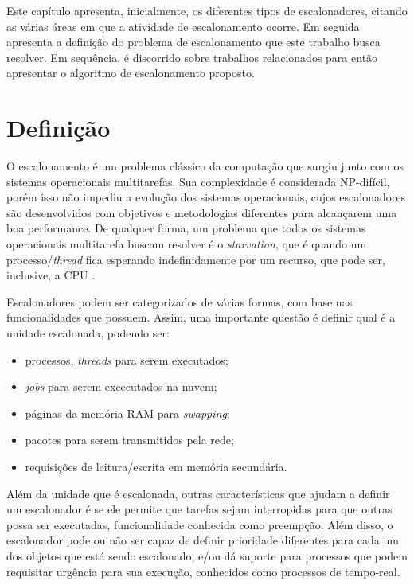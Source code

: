Este capítulo apresenta, inicialmente, os diferentes tipos de escalonadores, citando as várias áreas em que a atividade de escalonamento ocorre. Em seguida apresenta a definição do problema de escalonamento que este trabalho busca resolver. Em sequência, é discorrido sobre trabalhos relacionados para então apresentar o algoritmo de escalonamento proposto.

\section{Definição}

O escalonamento é um problema clássico da computação que surgiu junto com os sistemas operacionais multitarefas. Sua complexidade é considerada NP-difícil\cite{ULLMAN1975384}, porém isso não impediu a evolução dos sistemas operacionais, cujos escalonadores são desenvolvidos com objetivos e metodologias diferentes para alcançarem uma boa performance. De qualquer forma, um problema que todos os sistemas operacionais multitarefa buscam resolver é o \textit{starvation}, que é quando um processo/\textit{thread} fica esperando indefinidamente por um recurso, que pode ser, inclusive, a \acrshort{CPU} \cite{TANEMBAUM_SO}.

Escalonadores podem ser categorizados de várias formas, com base nas funcionalidades que possuem. Assim, uma importante questão é definir qual é a unidade escalonada, podendo ser:

	\begin{itemize}
		\item processos, \textit{threads} para serem executados;
		\item \textit{jobs} para serem excecutados na nuvem;
		\item páginas da memória \acrfull{RAM} para \textit{swapping};
		\item pacotes para serem transmitidos pela rede;
		\item requisições de leitura/escrita em memória secundária.
	\end{itemize}

	Além da unidade que é escalonada, outras características que ajudam a definir um escalonador é se ele permite que tarefas sejam interropidas para que outras possa ser executadas, funcionalidade conhecida como preempção. Além disso, o escalonador pode ou não ser capaz de definir prioridade diferentes para cada um dos objetos que está sendo escalonado, e/ou dá suporte para processos que podem requisitar urgência para sua execução, conhecidos como processos de tempo-real.

